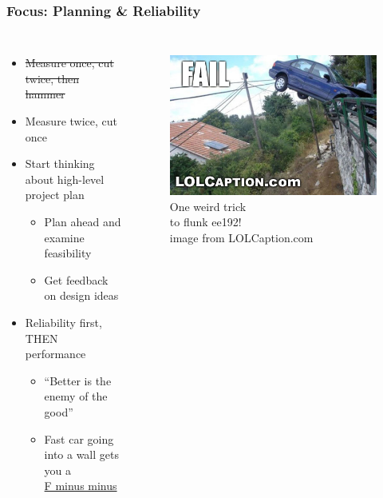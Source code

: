 \documentclass{beamer}
\begin{document}
\begin{frame}
\frametitle{Focus: Planning \& Reliability}
\begin{columns}[t]
\begin{itemize}
  \item \st{Measure once, cut twice, then hammer}
  \item Measure twice, cut once
  \item Start thinking about high-level project plan
  \begin{itemize}
    \item Plan ahead and examine feasibility
    \item Get feedback on design ideas
  \end{itemize}
  \item Reliability first, THEN performance
  \begin{itemize}
    \item ``Better is the enemy of the good''
    \item Fast car going into a wall gets you a \\ \href{http://tvtropes.org/pmwiki/pmwiki.php/Main/FMinusMinus}{F minus minus}
  \end{itemize}
\end{itemize}

\begin{figure}
  \centering
  \includegraphics[width=1.0\columnwidth]{images-dis2/car-crash} \newline
  One weird trick \\
  to flunk ee192! \\
  {\tiny image from LOLCaption.com}
\end{figure}
\end{columns}
\end{frame}
\end{document}
